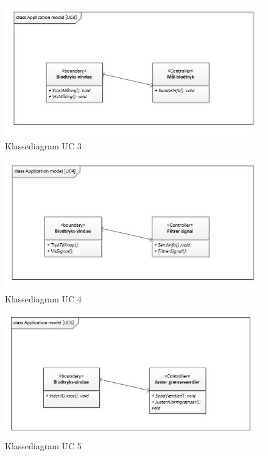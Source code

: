 \begin{figure}[H]
	\includegraphics[width=1\textwidth]{Figurer/classAppModelUC3}
	\caption{Klassediagram UC 3}
\end{figure}

\begin{figure}[H]
	\includegraphics[width=1\textwidth]{Figurer/classAppModelUC4}
	\caption{Klassediagram UC 4}
\end{figure}

\begin{figure}[H]
	\includegraphics[width=1\textwidth]{Figurer/classAppModelUC5}
	\caption{Klassediagram UC 5}
\end{figure}

